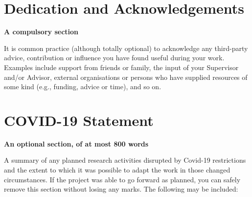 \documentclass[oneside,%
                    author={Malak Hajji},
                    degree={BSc},
                    title={Designing An Accessible Computational Toolkit For Students},
                  subtitle={With Mixed Visual Abilities}]{dissertation}
\begin{document}


\chapter*{Dedication and Acknowledgements}

{\bf A compulsory section}
\vspace{1cm} 

\noindent
It is common practice (although totally optional) to acknowledge any
third-party advice, contribution or influence you have found useful
during your work.  Examples include support from friends or family, 
the input of your Supervisor and/or Advisor, external organisations 
or persons who  have supplied resources of some kind (e.g., funding, 
advice or time), and so on.


%




\chapter*{COVID-19 Statement}

{\bf An optional section, of at most 800 words} 
\vspace{1cm} 

\noindent
A summary of any planned research activities disrupted by Covid-19 restrictions and the extent to which it was possible to adapt the work in those changed circumstances. If the project was able to go forward as planned, you can safely remove this section without losing any marks. The following may be included:
\end{document}

